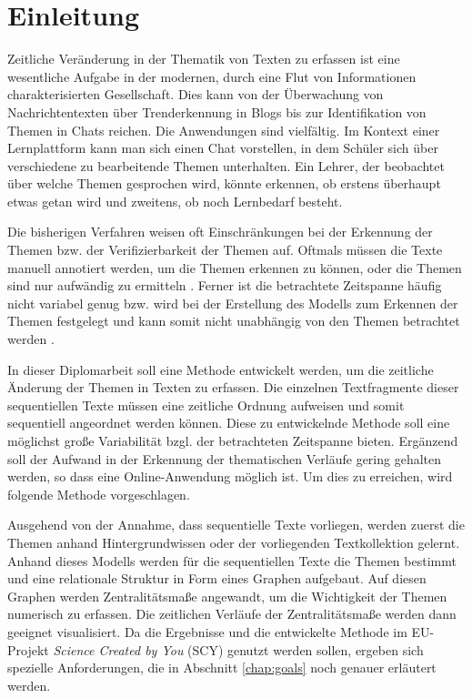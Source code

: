 \chapter{Einleitung}

Zeitliche Veränderung in der Thematik von Texten zu erfassen ist eine wesentliche Aufgabe in der modernen, durch eine Flut von Informationen charakterisierten Gesellschaft. Dies kann von der Überwachung von Nachrichtentexten \citep{newsTopic} über Trenderkennung in Blogs \citep{blogpulse} bis zur Identifikation von Themen in Chats reichen. Die Anwendungen sind vielfältig. Im Kontext einer Lernplattform kann man sich einen Chat vorstellen, in dem Schüler sich über verschiedene zu bearbeitende Themen unterhalten. Ein Lehrer, der beobachtet über welche Themen gesprochen wird, könnte erkennen, ob erstens überhaupt etwas getan wird und zweitens, ob noch Lernbedarf besteht.

Die bisherigen Verfahren weisen oft Einschränkungen bei der Erkennung der Themen bzw. der Verifizierbarkeit der Themen auf. Oftmals müssen die Texte manuell annotiert werden, um die Themen erkennen zu können, oder die Themen sind nur aufwändig zu ermitteln \citep{ldaSourceCode}. Ferner ist die betrachtete Zeitspanne häufig nicht variabel genug bzw. wird bei der Erstellung des Modells zum Erkennen der Themen festgelegt und kann somit nicht unabhängig von den Themen betrachtet werden \citep{topicsOverTime}.

In dieser Diplomarbeit soll eine Methode entwickelt werden, um die zeitliche Änderung der Themen in Texten zu erfassen. Die einzelnen Textfragmente dieser sequentiellen Texte müssen eine zeitliche Ordnung aufweisen und somit sequentiell angeordnet werden können. Diese zu entwickelnde Methode soll eine möglichst große Variabilität bzgl. der betrachteten Zeitspanne bieten. Ergänzend soll der Aufwand in der Erkennung der thematischen Verläufe gering gehalten werden, so dass eine Online-Anwendung möglich ist. Um dies zu erreichen, wird folgende Methode vorgeschlagen.

Ausgehend von der Annahme, dass sequentielle Texte vorliegen, werden zuerst die Themen anhand Hintergrundwissen oder der vorliegenden Textkollektion gelernt. Anhand dieses Modells werden für die sequentiellen Texte die Themen bestimmt und eine relationale Struktur in Form eines Graphen aufgebaut. Auf diesen Graphen werden Zentralitätsmaße angewandt, um die Wichtigkeit der Themen numerisch zu erfassen. Die zeitlichen Verläufe der Zentralitätsmaße werden dann geeignet visualisiert. Da die Ergebnisse und die entwickelte Methode im EU-Projekt \textit{Science Created by You} (SCY) genutzt werden sollen, ergeben sich spezielle Anforderungen, die in Abschnitt \ref{chap:goals} noch genauer erläutert werden. 


